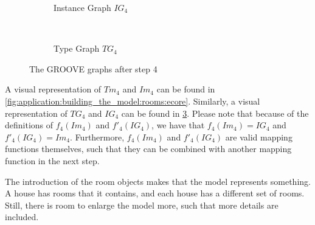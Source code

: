 \begin{figure}[p]
    \centering
    \begin{subfigure}{0.98\textwidth}
        \centering
        
        \caption{Instance Graph $IG_4$}
        \label{fig:application:building_the_model:rooms:groove:instance_graph}
    \end{subfigure}
    \\
    \begin{subfigure}{0.98\textwidth}
        \centering
        
        \caption{Type Graph $TG_4$}
        \label{fig:application:building_the_model:rooms:groove:type_graph}
    \end{subfigure}
    \caption{The GROOVE graphs after step 4}
    \label{fig:application:building_the_model:rooms:groove}
\end{figure}

A visual representation of $Tm_4$ and $Im_4$ can be found in \cref{fig:application:building_the_model:rooms:ecore}. Similarly, a visual representation of $TG_4$ and $IG_4$ can be found in \cref{fig:application:building_the_model:rooms:groove}. Please note that because of the definitions of $f_4(Im_4)$ and $f'_4(IG_4)$, we have that $f_4(Im_4) = IG_4$ and $f'_4(IG_4) = Im_4$. Furthermore, $f_4(Im_4)$ and $f'_4(IG_4)$ are valid mapping functions themselves, such that they can be combined with another mapping function in the next step.

The introduction of the room objects makes that the model represents something. A house has rooms that it contains, and each house has a different set of rooms. Still, there is room to enlarge the model more, such that more details are included.

\afterpage{\FloatBarrier}